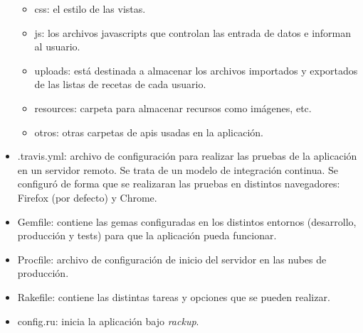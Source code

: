 \begin{itemize}
\begin{itemize}
			\item css: el estilo de las vistas.
			\item js: los archivos javascripts que controlan las entrada de datos e informan al usuario.
			\item uploads: está destinada a almacenar los archivos importados y exportados de las listas de recetas de cada usuario.
			\item resources: carpeta para almacenar recursos como imágenes, etc.
			\item otros: otras carpetas de apis usadas en la aplicación.
		\end{itemize}
	\item .travis.yml: archivo de configuración para realizar las pruebas de la aplicación en un servidor remoto. Se trata de un modelo de integración continua. Se configuró de forma que se realizaran las pruebas en distintos navegadores: Firefox (por defecto) y Chrome.
	\item Gemfile: contiene las gemas configuradas en los distintos entornos (desarrollo, producción y tests) para que la aplicación pueda funcionar.
	\item Procfile: archivo de configuración de inicio del servidor en las nubes de producción.
	\item Rakefile: contiene las distintas tareas y opciones que se pueden realizar. 
	\item config.ru: inicia la aplicación bajo \emph{rackup}.
\end{itemize}
